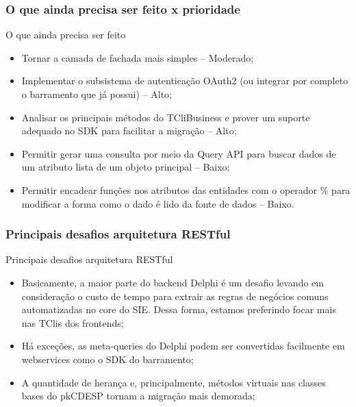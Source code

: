 \documentclass{beamer}
\begin{document}
\begin{frame}
\frametitle{O que ainda precisa ser feito x prioridade}

\begin{exampleblock}{O que ainda precisa ser feito}
	
	\begin{itemize}
		\item<1->Tornar a camada de fachada mais simples -- Moderado;
		\item<1->Implementar o subsistema de autenticação OAuth2 (ou integrar por completo o barramento que já possui) -- Alto;
		\item<1->Analisar os principais métodos do TCliBusiness e prover um suporte adequado no SDK para facilitar a migração -- Alto;
		\item<1->Permitir gerar uma consulta por meio da Query API para buscar dados de um atributo lista de um objeto principal -- Baixo;
		\item<1->Permitir encadear funções nos atributos das entidades com o operador \% para modificar a forma como o dado é lido da fonte de dados -- Baixo.
		
		
	\end{itemize}
	
\end{exampleblock}







\end{frame}


\begin{frame}
\frametitle{Principais desafios arquitetura RESTful}

\begin{exampleblock}{Principais desafios arquitetura RESTful}
	\small{
	\begin{itemize}
		\item<1->Basicamente, a maior parte do backend Delphi é um desafio levando em consideração o custo de tempo para extrair as regras de negócios comuns automatizadas no core do SIE. Dessa forma, estamos preferindo focar mais nas TClis dos frontends;
		\item<1->Há exceções, as meta-queries do Delphi podem ser convertidas facilmente em webservices como o SDK do barramento;
		\item<1->A quantidade de herança e, principalmente, métodos virtuais nas classes bases do pkCDESP tornam a migração mais demorada;
	\end{itemize}
}
\end{exampleblock}

\end{frame}
\end{document}
